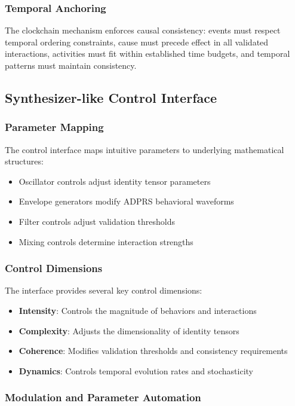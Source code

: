 \documentclass[11pt,a4paper]{article}
\begin{document}
\subsubsection{Temporal Anchoring}

The clockchain mechanism enforces causal consistency: events must respect temporal ordering constraints, cause must precede effect in all validated interactions, activities must fit within established time budgets, and temporal patterns must maintain consistency.

\subsection{Synthesizer-like Control Interface}

\subsubsection{Parameter Mapping}

The control interface maps intuitive parameters to underlying mathematical structures:
\begin{itemize}
\item Oscillator controls adjust identity tensor parameters
\item Envelope generators modify ADPRS behavioral waveforms
\item Filter controls adjust validation thresholds
\item Mixing controls determine interaction strengths
\end{itemize}

\subsubsection{Control Dimensions}

The interface provides several key control dimensions:
\begin{itemize}
\item \textbf{Intensity}: Controls the magnitude of behaviors and interactions
\item \textbf{Complexity}: Adjusts the dimensionality of identity tensors
\item \textbf{Coherence}: Modifies validation thresholds and consistency requirements
\item \textbf{Dynamics}: Controls temporal evolution rates and stochasticity
\end{itemize}

\subsubsection{Modulation and Parameter Automation}
\end{document}
